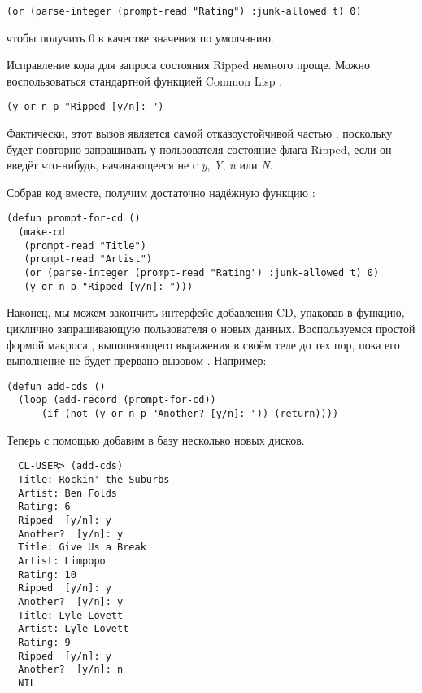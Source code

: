\begin{lstlisting}
(or (parse-integer (prompt-read "Rating") :junk-allowed t) 0)
\end{lstlisting}

чтобы получить 0 в качестве значения по умолчанию.

Исправление кода для запроса состояния Ripped немного проще. Можно воспользоваться
стандартной функцией Common Lisp .

\begin{lstlisting}
(y-or-n-p "Ripped [y/n]: ")
\end{lstlisting}

Фактически, этот вызов является самой отказоустойчивой частью ,
поскольку  будет повторно запрашивать у пользователя состояние флага
Ripped, если он введёт что-нибудь, начинающееся не с \textit{y}, \textit{Y}, \textit{n}
или \textit{N}.

Собрав код вместе, получим достаточно надёжную функцию :

\begin{lstlisting}
(defun prompt-for-cd ()
  (make-cd
   (prompt-read "Title")
   (prompt-read "Artist")
   (or (parse-integer (prompt-read "Rating") :junk-allowed t) 0)
   (y-or-n-p "Ripped [y/n]: ")))
\end{lstlisting}

Наконец, мы можем закончить интерфейс добавления CD, упаковав  в
функцию, циклично запрашивающую пользователя о новых данных. Воспользуемся простой формой
макроса , выполняющего выражения в своём теле до тех пор, пока его выполнение
не будет прервано вызовом . Например:

\begin{lstlisting}
(defun add-cds ()
  (loop (add-record (prompt-for-cd))
      (if (not (y-or-n-p "Another? [y/n]: ")) (return))))
\end{lstlisting}

Теперь с помощью  добавим в базу несколько новых дисков.

\begin{verbatim}
  CL-USER> (add-cds)
  Title: Rockin' the Suburbs
  Artist: Ben Folds
  Rating: 6
  Ripped  [y/n]: y
  Another?  [y/n]: y
  Title: Give Us a Break
  Artist: Limpopo
  Rating: 10
  Ripped  [y/n]: y
  Another?  [y/n]: y
  Title: Lyle Lovett
  Artist: Lyle Lovett
  Rating: 9
  Ripped  [y/n]: y
  Another?  [y/n]: n
  NIL
\end{verbatim}

